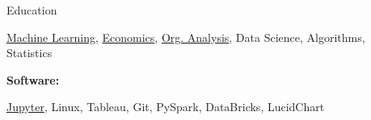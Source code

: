 \documentclass{resume/resume}
\begin{document}
\begin{rSection}{Education}
\begin{adjustwidth}{6em}{0pt}
    \href{https://github.com/Spelkington/mlearning}{Machine Learning},
    \href{https://www.youtube.com/watch?v=lMFQp3wN-cg}{Economics},
    \href{https://spelkington.github.io/assets/utah_office_update.pdf}{Org. Analysis},
    Data Science,
    Algorithms,
    Statistics
    
\end{adjustwidth}


%
%
%
\vspace{-3pt}
{\bf Software:}
\vspace{-1.83em}
\begin{adjustwidth}{6em}{0pt}
    \href{https://github.com/search?q=user\%3ASpelkington+user\%3AUtahTriangle+extension\%3Aipynb&type=Code}{Jupyter},
    Linux,
    Tableau,
    Git,
    PySpark,
    DataBricks,
    LucidChart

\end{adjustwidth}

\end{rSection}
\end{document}
